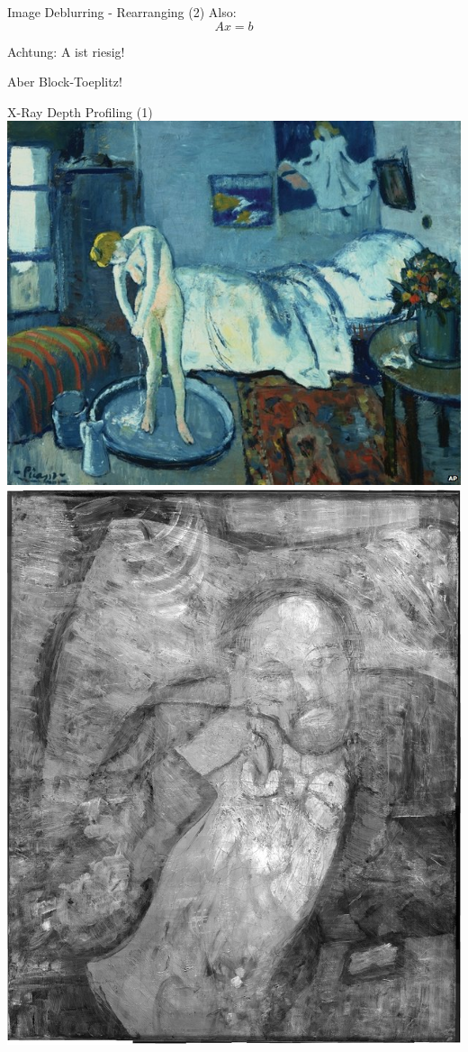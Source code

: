 \documentclass[11pt]{beamer}
\begin{document}
\begin{frame}{Image Deblurring - Rearranging (2)}
Also:
\[ Ax = b \]

Achtung: A ist riesig!
\pause

Aber Block-Toeplitz!
\end{frame}


\begin{frame}{X-Ray Depth Profiling (1)}
\includegraphics[scale=0.35]{blue_room}
\includegraphics[scale=0.15]{hidden_painting}
\end{frame}
\end{document}
